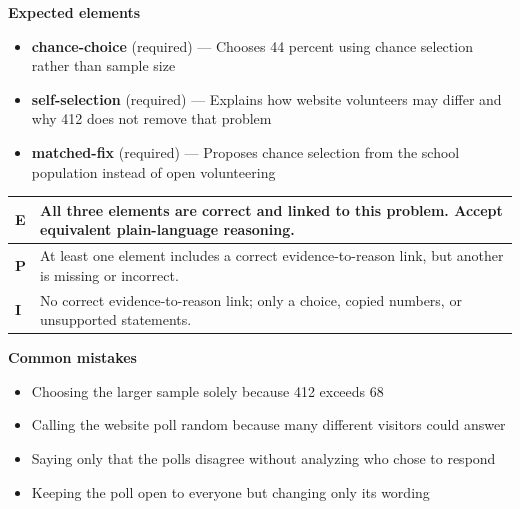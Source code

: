 \documentclass[11pt]{article}
\begin{document}

\textbf{Expected elements}
\begin{itemize}[leftmargin=1.5em,itemsep=2pt,topsep=2pt]
  \item \textbf{chance-choice} (required) --- Chooses 44 percent using chance selection rather than sample size
  \item \textbf{self-selection} (required) --- Explains how website volunteers may differ and why 412 does not remove that problem
  \item \textbf{matched-fix} (required) --- Proposes chance selection from the school population instead of open volunteering
\end{itemize}

{\small\renewcommand{\arraystretch}{1.25}
\noindent\begin{tabular}{|p{0.5in}|p{5.9in}|}
\hline
\textbf{E} & All three elements are correct and linked to this problem. Accept equivalent plain-language reasoning. \\ \hline
\textbf{P} & At least one element includes a correct evidence-to-reason link, but another is missing or incorrect. \\ \hline
\textbf{I} & No correct evidence-to-reason link; only a choice, copied numbers, or unsupported statements. \\ \hline
\end{tabular}}

\textbf{Common mistakes}
\begin{itemize}[leftmargin=1.5em,itemsep=2pt,topsep=2pt]
  \item Choosing the larger sample solely because 412 exceeds 68
  \item Calling the website poll random because many different visitors could answer
  \item Saying only that the polls disagree without analyzing who chose to respond
  \item Keeping the poll open to everyone but changing only its wording
\end{itemize}

\clearpage
{}
\end{document}
